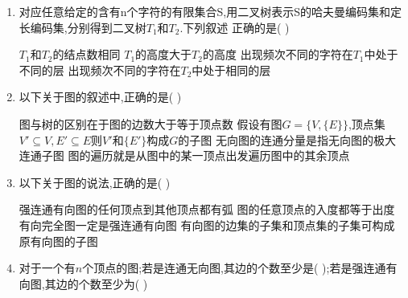 \documentclass[12pt, a4paper, oneside, UTF8]{ctexbook}
\begin{document}
\begin{enumerate}
    \item \bl 对应任意给定的含有n个字符的有限集合S,用二叉树表示S的哈夫曼编码集和定长编码集,分别得到二叉树$T_1$和$T_2$.下列叙述
    正确的是(    ) 
    \begin{choices}[1]
        \task $T_1$和$T_2$的结点数相同
        \task $T_1$的高度大于$T_2$的高度
        \task 出现频次不同的字符在$T_1$中处于不同的层
        \task 出现频次不同的字符在$T_2$中处于相同的层
    \end{choices}


    \item 以下关于图的叙述中,正确的是(    ) 
    \begin{choices}[1]
        \task 图与树的区别在于图的边数大于等于顶点数 
        \task 假设有图$G=\{V,\{E\}\}$,顶点集$V'\subseteq V, E' \subseteq E$则$V'$和$\{E'\}$构成$G$的子图 
        \task 无向图的连通分量是指无向图的极大连通子图 
        \task 图的遍历就是从图中的某一顶点出发遍历图中的其余顶点 
    \end{choices}


    \item 以下关于图的说法,正确的是(   ) 
    \begin{choices}[1]
        \task 强连通有向图的任何顶点到其他顶点都有弧 
        \task 图的任意顶点的入度都等于出度 
        \task 有向完全图一定是强连通有向图 
        \task 有向图的边集的子集和顶点集的子集可构成原有向图的子图 
    \end{choices}

    \item 对于一个有$n$个顶点的图;若是连通无向图,其边的个数至少是(   );若是强连通有向图,其边的个数至少为(   ) 
    

\end{enumerate}
\end{document}
